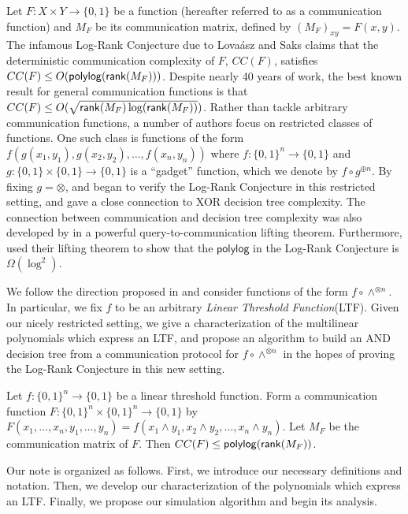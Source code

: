 Let $F: X\times Y\to \{0,1\}$ be a function (hereafter referred to as a communication function) and $M_F$ be its communication matrix, defined by $(M_F)_{xy} = F(x,y)$. The infamous Log-Rank Conjecture due to Lova\'{a}sz and Saks \cite{Lovasz1988} claims that the deterministic communication complexity of $F$, $CC(F)$, satisfies $CC(F) \leq O(\mathsf{polylog}(\mathsf{rank}(M_F)))$. Despite nearly 40 years of work, the best known result for general communication functions is that $CC(F) \leq O(\sqrt{\mathsf{rank}(M_F)\log(\mathsf{rank}(M_F))})$. Rather than tackle arbitrary communication functions, a number of authors focus on restricted classes of functions. One such class is functions of the form $f(g(x_1,y_1),g(x_2,y_2),\dots,f(x_n,y_n))$ where $f : \{0,1\}^n \to \{0,1\}$ and $g : \{0,1\}\times\{0,1\}\to\{0,1\}$ is a ``gadget'' function, which we denote by $f \circ g^{\oplus n}$. By fixing $g = \otimes$, \cite{Tsang2013} and \cite{Lovett2016} began to verify the Log-Rank Conjecture in this restricted setting, and gave a close connection to XOR decision tree complexity. The connection between communication and decision tree complexity was also developed by \cite{Goos2015} in a powerful query-to-communication lifting theorem. Furthermore, \cite{Goos2015} used their lifting theorem to show that the $\mathsf{polylog}$ in the Log-Rank Conjecture is $\Omega(\log^2)$.

We follow the direction proposed in \cite{Lovett2016} and consider functions of the form $f\circ \wedge^{\otimes n}$. In particular, we fix $f$ to be an arbitrary \textit{Linear Threshold Function}(LTF). Given our nicely restricted setting, we give a characterization of the multilinear polynomials which express an LTF, and propose an algorithm to build an AND decision tree from a communication protocol for $f\circ \wedge^{\otimes n}$ in the hopes of proving the Log-Rank Conjecture in this new setting. 
\begin{theorem}\label{mainresult}
	Let $f : \{0,1\}^n\to\{0,1\}$ be a linear threshold function. Form a communication function $F: \{0,1\}^n\times \{0,1\}^n\to\{0,1\}$ by $F(x_1,\dots,x_n,y_1,\dots,y_n)  = f(x_1 \wedge y_1,x_2\wedge y_2,\dots,x_n\wedge y_n)$. Let  $M_F$ be the communication matrix of $F$. Then $CC(F) \leq \mathsf{polylog}(\mathsf{rank}(M_F))$. 
\end{theorem}

Our note is organized as follows. First, we introduce our necessary definitions and notation. Then, we develop our characterization of the polynomials which express an LTF. Finally, we propose our simulation algorithm and begin its analysis. 